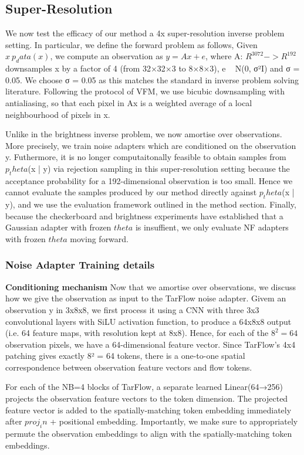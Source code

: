 \documentclass[12pt,a4paper]{report}
\begin{document}
\subsection{Super-Resolution}
We now test the efficacy of our method a 4x super-resolution inverse problem setting. 
In particular, we define the forward problem as follows, 
Given $x ~ p_data(x)$, we compute an observation as $y = Ax + e$, where A: $R^3072 -> R^192$ downsamples x by a factor of 4 (from 32×32×3 to 8×8×3),  e ~ N(0, σ²I) and σ = 0.05. 
We choose σ = 0.05 as this matches the standard in inverse problem solving literature. 
Following the protocol of VFM, we use bicubic downsampling with antialiasing, so that each pixel in Ax is a weighted average of a local neighbourhood of pixels in x. 

Unlike in the brightness inverse problem, we now amortise over observations. More precisely, we train noise adapters which are conditioned on the observation y.  
Futhermore, it is no longer computaitonally feasible to obtain samples from $p_theta$(x | y) via rejection sampling in this super-resolution setting because the acceptance probability for a 192-dimensional observation is too small. 
Hence we cannot evaluate the samples produced by our method directly against $p_theta$(x | y), and we use the evaluation framework outlined in the method section. 
Finally, because the checkerboard and brightness experiments have established that a Gaussian adapter with frozen $theta$ is insuffient, we only evaluate NF adapters with frozen $theta$ moving forward. 

\subsubsection{Noise Adapter Training details}
\textbf{Conditioning mechanism}
Now that we amortise over observations, we discuss how we give the observation as input to the TarFlow noise adapter. 
Givem an observation y in 3x8x8, we first process it using a CNN with three 3x3 convolutional layers with SiLU activation function, to produce a 64x8x8 output (i.e. 64 feature maps, with resolution kept at 8x8). 
Hence, for each of the $8^2=64$ observation pixels, we have a 64-dimensional feature vector. 
Since TarFlow's 4x4 patching gives exactly 8² = 64 tokens, there is a one-to-one spatial correspondence between observation feature vectors and flow tokens. 

For each of the NB=4 blocks of TarFlow, a separate learned Linear(64→256) projects the observation feature vectors to the token dimension. 
The projected feature vector is added to the spatially-matching token embedding immediately after $proj_in$ + positional embedding. 
Importantly, we make sure to appropriately permute the observation embeddings to align with the spatially-matching token embeddings. 
\end{document}
